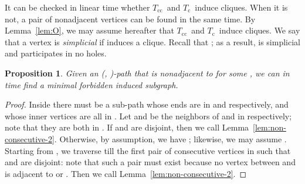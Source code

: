 \documentclass[10pt]{article}
\newtheorem{proposition}[theorem]{Proposition}
\newcommand{\badgraph}{minimal forbidden induced subgraph}
\newcommand{\stpath}[2]{(, )-path}
\newcommand{\oc}{\ensuremath{T_{\text{c}}}}
\newcommand{\occ}{\ensuremath{T_{\text{cc}}}}
\begin{document}
It can be checked in linear time whether \occ\ and \oc\ induce
cliques.  When it is not, a pair of nonadjacent vertices can be found
in the same time.  By Lemma~\ref{lem:O}, we may assume hereafter that
\occ\ and \oc\ induce cliques.  We say that a vertex  is {\em
  simplicial} if  induces a clique.  Recall that ; as a result,  is simplicial and participates in no holes.
\begin{proposition}\label{lem:non-bypass}
  Given an \stpath{h^l_0}{h^r_0}  that is nonadjacent to  for
  some , we can in  time find a \badgraph.
\end{proposition}
\begin{proof}
  Inside  there must be a sub-path  whose ends  are in 
  and  respectively, and whose inner vertices are all in
  .  Let  and  be the neighbors of  and 
  in  respectively; note that they are both in .  If
   and  are disjoint, then we call
  Lemma~\ref{lem:non-consecutive-2}.  Otherwise, by assumption, we
  have ; likewise, we may assume
  .  Starting from , we traverse
   till the first pair of consecutive vertices  in  such
  that  and  are disjoint: note that such a pair must
  exist because no vertex between  and  is adjacent to 
  or .  Then we call Lemma~\ref{lem:non-consecutive-2}.
\end{proof}
\end{document}
